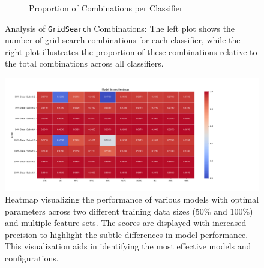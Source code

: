\begin{figure}[H]
\begin{subfigure}[b]{0.45\linewidth}
        \caption{Proportion of Combinations per Classifier}
        \label{fig:grid_search_donut}
    \end{subfigure}
    \caption{Analysis of \texttt{GridSearch} Combinations: The left plot shows the number of grid search combinations for each classifier, while the right plot illustrates the proportion of these combinations relative to the total combinations across all classifiers.}
    \label{fig:grid_search_analysis}
\end{figure}

\begin{figure}[H]
    \centering
    \includegraphics[trim=0cm 0cm 5cm 0cm, clip, width=\linewidth]{assets/images/best_classifier/eval_heatmap.png}
    \caption{Heatmap visualizing the performance of various models with optimal parameters across two different training data sizes (50\% and 100\%) and multiple feature sets. The scores are displayed with increased precision to highlight the subtle differences in model performance. This visualization aids in identifying the most effective models and configurations.}
    \label{fig:eval_heatmap}
\end{figure}

